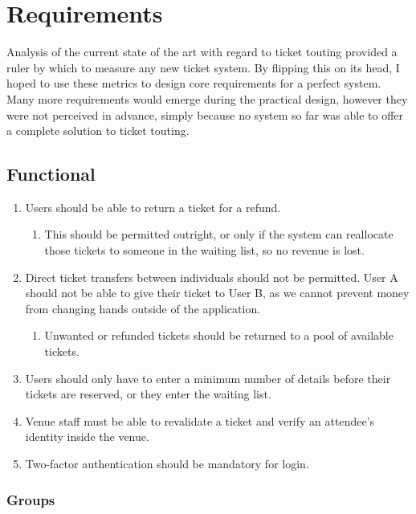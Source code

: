 \documentclass[12pt,a4]{bhamdissertation}
\begin{document}
\chapter{Requirements}

Analysis of the current state of the art with regard to ticket touting provided a ruler by which to measure any new ticket system. By flipping this on its head, I hoped to use these metrics to design core requirements for a perfect system. Many more requirements would emerge during the practical design, however they were not perceived in advance, simply because no system so far was able to offer a complete solution to ticket touting.

\section{Functional}

\begin{enumerate}
    \item Users should be able to return a ticket for a refund.
    \begin{enumerate}
        \item This should be permitted outright, or only if the system can reallocate those tickets to someone in the waiting list, so no revenue is lost.
    \end{enumerate}
    \item Direct ticket transfers between individuals should not be permitted. User A should not be able to give their ticket to User B, as we cannot prevent money from changing hands outside of the application.
    \begin{enumerate}
        \item Unwanted or refunded tickets should be returned to a pool of available tickets.
    \end{enumerate}
    \item Users should only have to enter a minimum number of details before their tickets are reserved, or they enter the waiting list.
    \item Venue staff must be able to revalidate a ticket and verify an attendee's identity inside the venue.
    \item Two-factor authentication should be mandatory for login.
\end{enumerate}

\subsection{Groups}
\end{document}
